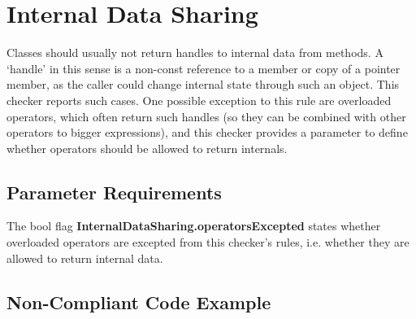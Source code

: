 %
%

\section{Internal Data Sharing}
\label{InternalDataSharing::overview}

Classes should usually not return handles to internal data from methods. A
`handle' in this sense is a non-const reference to a member or copy of a
pointer member, as the caller could change internal state through such an
object. This checker reports such cases. One possible exception to this rule
are overloaded operators, which often return such handles (so they can be
combined with other operators to bigger expressions), and this checker
provides a parameter to define whether operators should be allowed to return
internals.

\subsection{Parameter Requirements}

The bool flag {\bf InternalDataSharing.operatorsExcepted} states whether
overloaded operators are excepted from this checker's rules, i.e. whether
they are allowed to return internal data.

\subsection{Non-Compliant Code Example}

